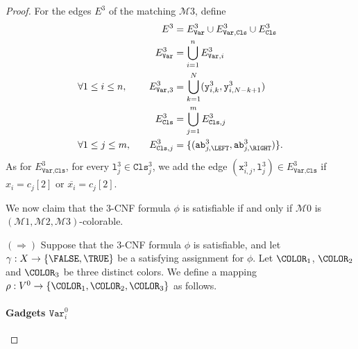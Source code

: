 \begin{proof}
    For the edges $E^{3}$ of the matching $\mathcal{M}{3}$,
    define
    \begin{alignat*}{2}
      &&
      E^{3} &= E^{3}_{\texttt{Var}} \cup E^{3}_{\texttt{Var},\texttt{Cls}} \cup E^{3}_{\texttt{Cls}}
      \\
      &&
      E^{3}_{\texttt{Var}} &= \bigcup_{i=1}^{n} E^{3}_{\texttt{Var}, i}
      \\
      &\forall 1\leq i \leq n,\quad&
      E^{3}_{\texttt{Var}, 3} &= \bigcup_{k=1}^{N} (\texttt{y}^{3}_{i,k}, \texttt{y}^{3}_{i,N-k+1})
      \\
      &&
      E^{3}_{\texttt{Cls}} &= \bigcup_{j=1}^{m} E^{3}_{\texttt{Cls}, j}
      \\
      &\forall 1\leq j \leq m,\quad&
      E^{3}_{\texttt{Cls}, j} &=
      \{
      (\texttt{ab}^{3}_{j,\LEFT}, \texttt{ab}^{3}_{j,\RIGHT})
      \}\text{.}
    \end{alignat*}
    As for $E^{3}_{\texttt{Var},\texttt{Cls}}$,
    for every $\texttt{l}^{3}_{j} \in \texttt{Cls}^{3}_{j}$,
    we add the edge
    $(\texttt{x}^{3}_{i,j}, \texttt{l}^{3}_{j}) \in E^{3}_{\texttt{Var},\texttt{Cls}}$
    if $x_{i} = c_{j}[2]$ or $\overline{x_{i}} = c_{j}[2]$.

  \bigskip

  We now claim that the $3$-CNF formula $\phi$ is satisfiable
  if and only if
  $\mathcal{M}{0}$ is $(\mathcal{M}{1}, \mathcal{M}{2}, \mathcal{M}{3})$-colorable.

  $(\Rightarrow)$
  Suppose that the $3$-CNF formula $\phi$ is satisfiable, and
  let $\gamma : X \to \{\FALSE, \TRUE\}$ be a satisfying assignment
  for $\phi$.
  Let $\COLOR_1$, $\COLOR_2$ and $\COLOR_3$ be three distinct colors.
  We define a mapping
  $\rho : V^{0} \to \{\COLOR_1, \COLOR_2, \COLOR_3\}$ as follows.

  \paragraph*{Gadgets $\texttt{Var}^{0}_{i}$}


\end{proof}
